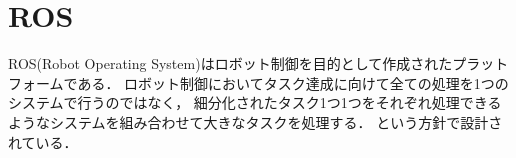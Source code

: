 \section{ROS}
ROS(Robot Operating System)はロボット制御を目的として作成されたプラットフォームである．
ロボット制御においてタスク達成に向けて全ての処理を1つのシステムで行うのではなく，
細分化されたタスク1つ1つをそれぞれ処理できるようなシステムを組み合わせて大きなタスクを処理する．
という方針で設計されている．